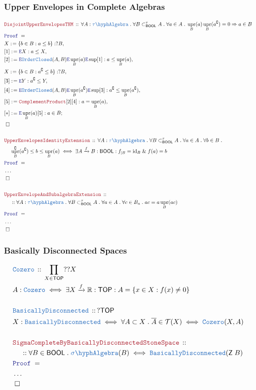 \documentclass[12pt]{scrartcl}
\newcommand{\TYPE}[1]{\textcolor{NavyBlue}{\mathtt{#1}}}
\newcommand{\LOGIC}[1]{\textcolor{Blue}{\mathtt{#1}}}
\newcommand{\THM}[1]{\textcolor{Maroon}{\mathtt{#1}}}
\renewcommand{\.}{\; . \;}
\newcommand{\de}{: \kern 0.1pc =}
\newcommand{\Theorem}[2]{& \THM{#1} \, :: \, #2 \\ & \Proof = \\ }
\newcommand{\DeclareType}[2]{& \TYPE{#1} \, :: \, #2 \\}
\newcommand{\DefineType}[3]{& #1 : \TYPE{#2} \iff #3 \\}
\newcommand{\NewLine}{\\ & \kern 1pc}
\newcommand{\Page}[1]{ \begin{align*} #1 \end{align*}   }
\newcommand{\NoProof}{ & \ldots \\ \EndProof}
\renewcommand{\And}{\; \& \;}
\newcommand{\Imply}{\Rightarrow}
\newcommand{\Elim}{\LOGIC{E}}
\newcommand{\Reals}{\mathbb{R} }
\DeclareMathOperator*{\id}{id}
\newcommand{\Arrow}{\xrightarrow}
\renewcommand{\c}{\complement}
\newcommand{\Say}[3]{& #1 \de #2 : #3, \\}
\newcommand{\Conclude}[3]{& #1 \de #2 : #3; \\}
\newcommand{\QED}{\; \square}
\newcommand{\EndProof}{& \QED \\}
\newcommand{\Proof}{\LOGIC{Proof} \; }
\newcommand{\SA}{\TYPE{\sigma \hyph Algebra}}
\newcommand{\TOP}{\mathsf{TOP}}
\newcommand{\T}{\mathcal{T}}
\newcommand{\OC}{\TYPE{OrderClosed}}
\newcommand{\TAlgebra}{\TYPE{\tau\hyph Algebra}}
\DeclareMathOperator{\upr}{upr}
\newcommand{\BOOL}{\mathsf{BOOL}}
\newcommand{\Z}{\mathsf{Z}}
\begin{document}
\subsubsection{Upper Envelopes in Complete Algebras}
\Page{
	\Theorem{DisjointUpperEnvelopesTHM}
	{
		\forall A : \TAlgebra \.
		\forall B \subset_\BOOL^\tau A \. 	
		\forall a \in A \.
		\upr_B(a)\upr_B(a^\c) = 0
		\Imply
		a \in B
	}
	\Say{X}{\{ b \in B : a \le b\}}{?B}
	\Say{[1]}{\Elim X}{ a \le X }
	\Say{[2]}{\Elim \OC(A,B)\Elim \upr_B(a) \Elim \sup [1]}{a \le \upr_B(a) }
	\Say{X}{\{ b \in B : a^\c \le b\}}{?B}
	\Say{[3]}{\Elim Y}{ a^\c \le Y }
	\Say{[4]}{\Elim \OC(A,B)\Elim \upr_B(a^\c) \Elim \sup [3]}{a^\c \le \upr_B(a^\c) }
	\Say{[5]}{\THM{ComplementProduct}[2][4]}
	{
		a = \upr_B(a)
	}
	\Conclude{[*]}{\Elim \upr_B(a)[5]}{a \in B}
	\EndProof
	\\
	\Theorem{UpperEnvelopesIdentityExtension}
	{
		\forall A : \TAlgebra \.
		\forall B \subset_\BOOL^\tau A \. 	
		\forall a \in A \.
		\forall b \in B \.
		\NewLine
		\upr^\c_B(a^\c) \le b \le \upr_B(a) 
		\iff
		\exists A \Arrow{f} B : \BOOL :
		f_{|B} = {\id}_B \And f(a) = b
	}
	\NoProof
	\\
	\Theorem{UpperEnvelopeAndSubalgebraExtension}{
		\NewLine ::		
		\forall A : \TAlgebra \.
		\forall B \subset^\tau_\BOOL A \.
		\forall a \in A \.
		\forall c \in B_a \.
		ac = a \upr_B(ac)
	}
	\NoProof
}
\newpage
\subsubsection{Basically Disconnected Spaces }
\Page{
	\DeclareType{Cozero}{\prod_{X \in \TOP}??X}
	\DefineType{A}{Cozero}{\exists X \Arrow{f} \Reals : \TOP : A = \{ x \in X : f(x) \neq 0 \}}
	\\
	\DeclareType{BasicallyDisconnected}{?\TOP}
	\DefineType{X}{BasicallyDisconnected}{
		\forall A \subset X \. 
		\overline{A} \in \T(X)
		\iff
		\TYPE{Cozero}(X,A)
	}
	\\
	\Theorem{SigmaCompleteByBasicallyDisconnectedStoneSpace}
	{
		\NewLine :: 		
		\forall B \in \BOOL \. 
		\SA(B) \iff  \TYPE{BasicallyDisconnected}(\Z\;B)
	}
	\NoProof
}
\newpage
\end{document}
